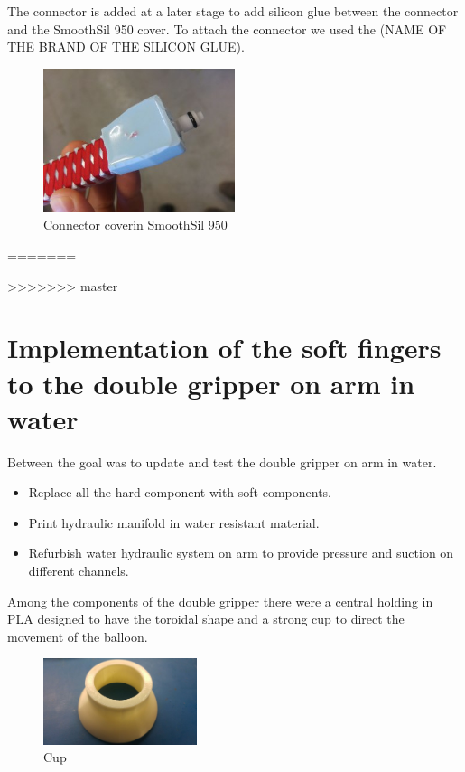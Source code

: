 \documentclass{article}
\begin{document}
The connector is added at a later stage to add silicon glue between the connector and the SmoothSil 950 cover. To attach the connector we used the (NAME OF THE BRAND OF THE SILICON GLUE). 
\begin{figure}[h]
	\centering
	\includegraphics[width=0.5\textwidth]{Pictures/fingerOnToroidal/ConnectorCover.jpg}
	\caption{Connector coverin SmoothSil 950}
	\label{fig:connectorCover}
\end{figure}

=======
 
>>>>>>> master

\newpage

\section{Implementation of the soft fingers to the double gripper on arm in water}
Between the goal was to update and test the double gripper on arm in water.
\begin{itemize}
    \item	Replace all the hard component with soft components.
    \item	Print hydraulic manifold in water resistant material.
    \item	Refurbish water hydraulic system on arm to provide pressure and suction on different channels.
\end{itemize}

Among the components of the double gripper there were a central holding in PLA designed to have the toroidal shape and a strong cup to direct the movement of the balloon.\\
\begin{figure}[h]
    \centering
    \includegraphics[width=0.4\textwidth]{Pictures/fingerOnToroidal/cup.jpg}
    \caption{Cup}
    \label{fig:cup}
\end{figure}
\end{document}
